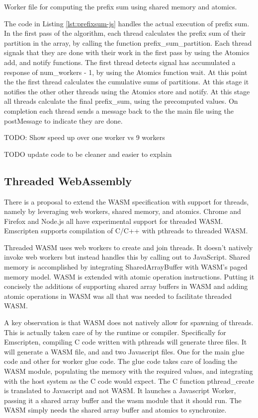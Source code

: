 \documentclass[11pt]{article}
\begin{document}
\begin{listing}[H]    
\inputminted[fontsize=\small,baselinestretch=0.5,linenos]{javascript}{code/shared/prefix_sum.js}
        \caption{Worker file for computing the prefix sum using shared memory and atomics.}    
        \label{lst:prefixsum-js}    
\end{listing}    


The code in Listing \ref{lst:prefixsum-js} handles the actual execution of prefix sum. In the first pass of the algorithm, each thread calculates the prefix sum of their partition in the array, by calling the function prefix\_sum\_partition. Each thread signals that they are done with their work in the first pass by using the Atomics add, and notify functions. The first thread detects signal has accumulated a response of num\_workers - 1, by using the Atomics function wait. At this point the the first thread calculates the cumulative sums of partitions. At this stage it notifies the other other threads using the Atomics store and notify. At this stage all threads calculate the final prefix\_sum, using the precomputed values. On completion each thread sends a message back to the the main file using the postMessage to indicate they are done. 


TODO: Show speed up over one worker vs 9 workers

TODO update code to be cleaner and easier to explain

\subsection{Threaded WebAssembly}
There is a proposal to extend the WASM specification with support for threads, namely by leveraging web workers, shared memory, and atomics. Chrome and Firefox and Node.js all have experimental support for threaded WASM. Emscripten supports compilation of C/C++ with pthreads to threaded WASM.

Threaded WASM uses web workers to create and join threads. It doesn't natively invoke web workers but instead handles this by calling out to JavaScript. Shared memory is accomplished by integrating SharedArrayBuffer with WASM's paged memory model. WASM is extended with atomic operation instructions. Putting it concisely the additions of supporting shared array buffers in WASM and adding atomic operations in WASM was all that was needed to facilitate threaded WASM.

A key observation is that WASM does not natively allow for spawning of threads. This is actually taken care of by the runtime or compiler. Specifically for Emscripten, compiling C code written with pthreads will generate three files. It will generate a WASM file, and and two Javascript files. One for the main glue code and other for worker glue code. The glue code takes care of loading the WASM module, populating the memory with the required values, and integrating with the host system as the C code would expect. The C function pthread\_create is translated to Javascript and not WASM. It launches a Javascript Worker, passing it a shared array buffer and the wasm module that it should run. The WASM simply needs the shared array buffer and atomics to synchronize.  
\end{document}

